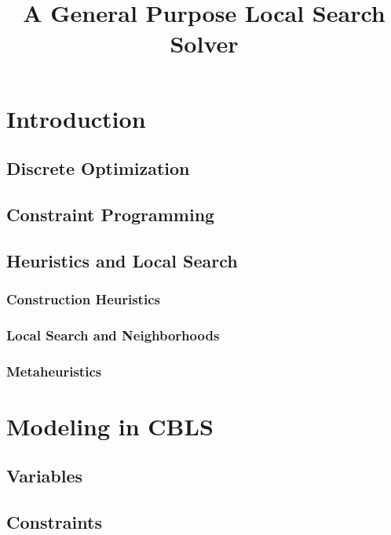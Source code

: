 \documentclass[a4paper,12pt]{article}
\title{A General Purpose Local Search Solver}
\begin{document}
\maketitle

\tableofcontents
\listoffigures
\newpage
\section{Introduction}
  \subsection{Discrete Optimization}
  \subsection{Constraint Programming}
  \subsection{Heuristics and Local Search}
  \subsubsection{Construction Heuristics}
  \subsubsection{Local Search and Neighborhoods}
  \subsubsection{Metaheuristics}

\section{Modeling in CBLS}
  \subsection{Variables} 
  
  \subsection{Constraints}
  
\end{document}

